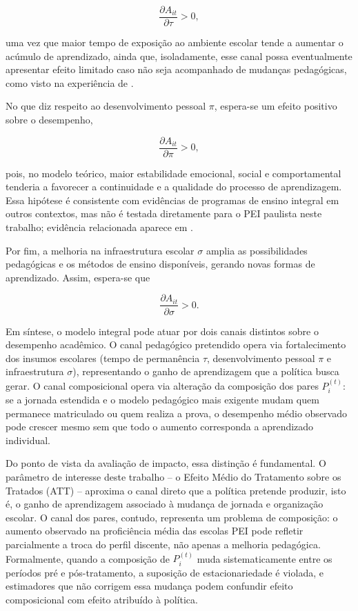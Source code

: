 \begin{equation*}
\frac{\partial A_{it}}{\partial \tau} > 0,
\end{equation*}

uma vez que maior tempo de exposição ao ambiente escolar tende a aumentar o acúmulo de aprendizado, ainda que, isoladamente, esse canal possa eventualmente apresentar efeito limitado caso não seja acompanhado de mudanças pedagógicas, como visto na experiência de \textcite{AlmeidaEtAl2016MaisEducacao}.

No que diz respeito ao desenvolvimento pessoal $\pi$, espera-se um efeito positivo sobre o desempenho,

\begin{equation*}
\frac{\partial A_{it}}{\partial \pi} > 0,
\end{equation*}

pois, no modelo teórico, maior estabilidade emocional, social e comportamental tenderia a favorecer a continuidade e a qualidade do processo de aprendizagem. Essa hipótese é consistente com evidências de programas de ensino integral em outros contextos, mas não é testada diretamente para o PEI paulista neste trabalho; evidência relacionada aparece em \textcite{araujo2020_pernambuco_impacto_enem}. 

Por fim, a melhoria na infraestrutura escolar $\sigma$ amplia as possibilidades pedagógicas e os métodos de ensino disponíveis, gerando novas formas de aprendizado. Assim, espera-se que

\begin{equation*}
\frac{\partial A_{it}}{\partial \sigma} > 0.
\end{equation*}

Em síntese, o modelo integral pode atuar por dois canais distintos sobre o desempenho acadêmico. O canal pedagógico pretendido opera via fortalecimento dos insumos escolares (tempo de permanência $\tau$, desenvolvimento pessoal $\pi$ e infraestrutura $\sigma$), representando o ganho de aprendizagem que a política busca gerar. O canal composicional opera via alteração da composição dos pares $P_i^{(t)}$: se a jornada estendida e o modelo pedagógico mais exigente mudam quem permanece matriculado ou quem realiza a prova, o desempenho médio observado pode crescer mesmo sem que todo o aumento corresponda a aprendizado individual.

Do ponto de vista da avaliação de impacto, essa distinção é fundamental. O parâmetro de interesse deste trabalho -- o Efeito Médio do Tratamento sobre os Tratados (ATT) -- aproxima o canal direto que a política pretende produzir, isto é, o ganho de aprendizagem associado à mudança de jornada e organização escolar. O canal dos pares, contudo, representa um problema de composição: o aumento observado na proficiência média das escolas PEI pode refletir parcialmente a troca do perfil discente, não apenas a melhoria pedagógica. Formalmente, quando a composição de $P_i^{(t)}$ muda sistematicamente entre os períodos pré e pós-tratamento, a suposição de estacionariedade é violada, e estimadores que não corrigem essa mudança podem confundir efeito composicional com efeito atribuído à política.
